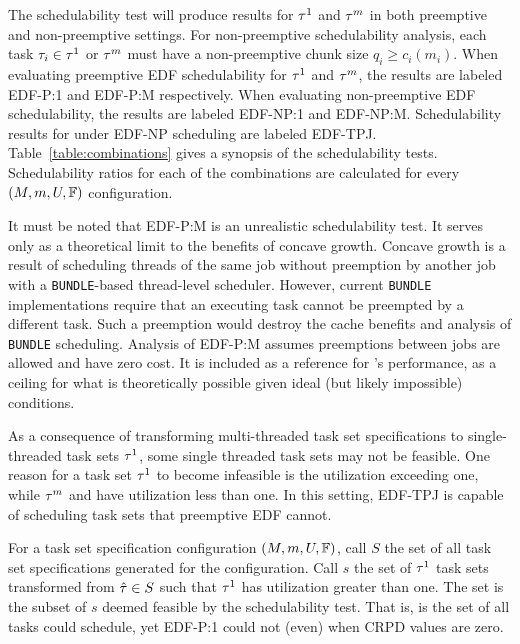 \documentclass[a4paper,UKenglish,cleveref,autoref,english]{lipics-v2019}
\begin{document}
The \npchunks{} schedulability test will produce results for
${\tau{}^1}$ and ${\tau{}^m}$ in both preemptive and
non-preemptive settings. For non-preemptive schedulability analysis,
each task ${\tau_{i} \in \tau{}^1}$ or ${\tau{}^m}$ must have a
non-preemptive chunk size ${q_i \ge c_i(m_i)}$. When evaluating
preemptive EDF schedulability for ${\tau{}^1}$ and ${\tau{}^m}$,
the results are labeled EDF-P:1 and EDF-P:M respectively. When
evaluating non-preemptive EDF schedulability, the results are labeled
EDF-NP:1 and EDF-NP:M. Schedulability results for \tpj{} under EDF-NP
scheduling are labeled EDF-TPJ. Table~\ref{table:combinations} gives a
synopsis of the schedulability tests. Schedulability ratios for each
of the combinations are calculated for every ${(M, m, U, \mathbb{F}{})}$ 
configuration.


It must be noted that EDF-P:M is an unrealistic schedulability
test. It serves only as a theoretical limit to the benefits of concave
growth. Concave growth is a result of scheduling threads of the same
job without preemption by another job with a \texttt{BUNDLE}-based
thread-level scheduler.  However, current \texttt{BUNDLE}
implementations require that an executing task cannot be
preempted by a different task.  Such a preemption would destroy the
cache benefits and analysis of \texttt{BUNDLE} scheduling. Analysis of
EDF-P:M assumes preemptions between jobs are allowed and
have zero cost. It is included as a reference for \tpj{}'s
performance, as a ceiling for what is theoretically possible given
ideal (but likely impossible) conditions.

As a consequence of transforming multi-threaded task set
specifications \ants{} to single-threaded task sets ${\tau{}^1}$,
some single threaded task sets may not be feasible. One reason for a
task set ${\tau{}^1}$ to become infeasible is the 
utilization exceeding one, while ${\tau{}^m}$ and \ants{} have
utilization less than one. In this setting, EDF-TPJ
is capable of scheduling task sets that preemptive EDF cannot.

For a task set specification configuration ${(M, m, U, \mathbb{F}{})}$,
call ${S}$ the set of all task set specifications \ants{} generated
for the configuration. Call ${s}$ the set of ${\tau{}^1}$ task sets
transformed from ${\hat{\tau}{} \in S}$ such that ${\tau{}^1}$ has
utilization greater than one. The set \stpj{} is the subset of ${s}$ deemed feasible
by the \tpj{} schedulability test. That is, \stpj{} is the set of all
tasks \tpj{} could schedule, yet EDF-P:1 could not (even) when CRPD
values are zero.
\end{document}
